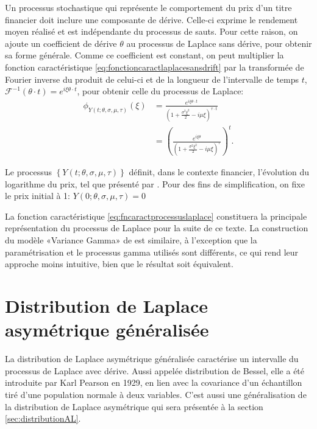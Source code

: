 Un processus stochastique qui représente le comportement du prix d'un
titre financier doit inclure une composante de dérive.  Celle-ci
exprime le rendement moyen réalisé et est indépendante du processus de
sauts. Pour cette raison, on ajoute un coefficient de dérive $\theta$
au processus de Laplace sans dérive, pour obtenir sa forme
générale. Comme ce coefficient est constant, on peut multiplier la
fonction caractéristique \eqref{eq:fonctioncaractlaplacesansdrift} par
la transformée de Fourier inverse du produit de celui-ci et de la
longueur de l'intervalle de temps $t$, $\mathcal{F}^{-1}(\theta \cdot
t) = e^{i\xi\theta \cdot t}$, pour obtenir celle du processus de
Laplace:
\begin{align}
  \phi_{Y(t;\theta,\sigma,\mu,\tau)}(\xi) &= \frac{e^{i\xi\theta\cdot t}}{\left(1+\frac{\sigma^2\xi^2}{2}- i\mu \xi \right)^{\tau \cdot t}} \nonumber\\
  &= \left(\frac{e^{i\xi\theta}}{\left(1+\frac{\sigma^2\xi^2}{2}- i\mu
        \xi
      \right)^{\tau}}\right)^{t} \label{eq:fncaractprocessuslaplace}.
\end{align}

Le processus $\left\{Y(t;\theta,\sigma,\mu,\tau)\right\}$ définit,
dans le contexte financier, l'évolution du logarithme du prix, tel que
présenté par \cite{kotz2001laplace}. Pour des fins de simplification,
on fixe le prix initial à 1: $Y(0;\theta,\sigma,\mu,\tau) = 0$

La fonction caractéristique \eqref{eq:fncaractprocessuslaplace}
constituera la principale représentation du processus de Laplace pour
la suite de ce texte.  La construction du modèle «Variance Gamma» de
\cite{madan1990variance} est similaire, à l'exception que la
paramétrisation et le processus gamma utilisés sont différents, ce qui
rend leur approche moins intuitive, bien que le résultat soit
équivalent.

\section{Distribution de Laplace asymétrique généralisée}
\label{sec:distributionGAL}

La distribution de Laplace asymétrique généralisée caractérise un
intervalle du processus de Laplace avec dérive. Aussi appelée
distribution de Bessel, elle a été introduite par Karl Pearson en
1929, en lien avec la covariance d'un échantillon tiré d'une
population normale à deux variables. C'est aussi une généralisation de
la distribution de Laplace asymétrique qui sera présentée à la section
\ref{sec:distributionAL}.

